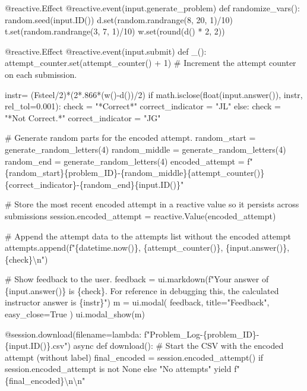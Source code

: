 \documentclass[
  letterpaper,
  DIV=11,
  numbers=noendperiod]{scrreprt}
\newenvironment{Shaded}{\begin{snugshade}}{\end{snugshade}}
\newcommand{\NormalTok}[1]{\textcolor[rgb]{0.00,0.23,0.31}{#1}}
\begin{document}
\begin{Shaded}
\begin{Highlighting}[]
\NormalTok{    @reactive.Effect}
\NormalTok{    @reactive.event(input.generate\_problem)}
\NormalTok{    def randomize\_vars():}
\NormalTok{        random.seed(input.ID())}
\NormalTok{        d.set(random.randrange(8, 20, 1)/10)}
\NormalTok{        t.set(random.randrange(3, 7, 1)/10)}
\NormalTok{        w.set(round(d() * 2, 2))}
        

\NormalTok{    @reactive.Effect}
\NormalTok{    @reactive.event(input.submit)}
\NormalTok{    def \_():}
\NormalTok{        attempt\_counter.set(attempt\_counter() + 1)  \# Increment the attempt counter on each submission.  }
      
\NormalTok{        instr= (Fsteel/2)*(2*.866*(w(){-}d())/2)}
\NormalTok{        if math.isclose(float(input.answer()), instr, rel\_tol=0.001):}
\NormalTok{            check = "*Correct*"}
\NormalTok{            correct\_indicator = "JL"}
\NormalTok{        else:}
\NormalTok{            check = "*Not Correct.*"}
\NormalTok{            correct\_indicator = "JG"}

\NormalTok{        \# Generate random parts for the encoded attempt.}
\NormalTok{        random\_start = generate\_random\_letters(4)}
\NormalTok{        random\_middle = generate\_random\_letters(4)}
\NormalTok{        random\_end = generate\_random\_letters(4)}
\NormalTok{        encoded\_attempt = f"\{random\_start\}\{problem\_ID\}{-}\{random\_middle\}\{attempt\_counter()\}\{correct\_indicator\}{-}\{random\_end\}\{input.ID()\}"}

\NormalTok{        \# Store the most recent encoded attempt in a reactive value so it persists across submissions}
\NormalTok{        session.encoded\_attempt = reactive.Value(encoded\_attempt)}

\NormalTok{        \# Append the attempt data to the attempts list without the encoded attempt}
\NormalTok{        attempts.append(f"\{datetime.now()\}, \{attempt\_counter()\}, \{input.answer()\}, \{check\}\textbackslash{}n")}

\NormalTok{        \# Show feedback to the user.}
\NormalTok{        feedback = ui.markdown(f"Your answer of \{input.answer()\} is \{check\}. For reference in debugging this, the calculated instructor answer is \{instr\}")}
\NormalTok{        m = ui.modal(}
\NormalTok{            feedback,}
\NormalTok{            title="Feedback",}
\NormalTok{            easy\_close=True}
\NormalTok{        )}
\NormalTok{        ui.modal\_show(m)}

\NormalTok{    @session.download(filename=lambda: f"Problem\_Log{-}\{problem\_ID\}{-}\{input.ID()\}.csv")}
\NormalTok{    async def download():}
\NormalTok{        \# Start the CSV with the encoded attempt (without label)}
\NormalTok{        final\_encoded = session.encoded\_attempt() if session.encoded\_attempt is not None else "No attempts"}
\NormalTok{        yield f"\{final\_encoded\}\textbackslash{}n\textbackslash{}n"}
        

\end{Highlighting}
\end{Shaded}
\end{document}
